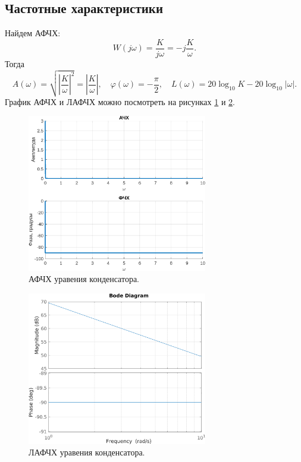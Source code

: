 \subsection{Частотные характеристики}

Найдем АФЧХ:
\begin{equation*}
    W(j\omega)=\frac{K}{j\omega}=-j\frac{K}{\omega}.
\end{equation*}
Тогда
\begin{equation*}
    A(\omega)=\sqrt{\left| \frac{K}{\omega}  \right|^2}=\left| \frac{K}{\omega}  \right|,\quad
    \varphi(\omega)=-\frac{\pi}{2}, \quad L(\omega)=20\log_{10}K-20\log_{10}|\omega|.
\end{equation*}
График АФЧХ и ЛАФЧХ можно посмотреть на рисунках \ref{fig:task_3_АФЧХ} и \ref{fig:task_3_ЛАФЧХ}.

\begin{figure}[htbp]
    \centering
    \includegraphics[width=0.7\textwidth]{figs/task_3_АФЧХ.png}
    \caption{АФЧХ уравения конденсатора.}
    \label{fig:task_3_АФЧХ}
\end{figure}

\begin{figure}[htbp]
    \centering
    \includegraphics[width=0.7\textwidth]{figs/task_3_ЛАФЧХ.png}
    \caption{ЛАФЧХ уравения конденсатора.}
    \label{fig:task_3_ЛАФЧХ}
\end{figure}

